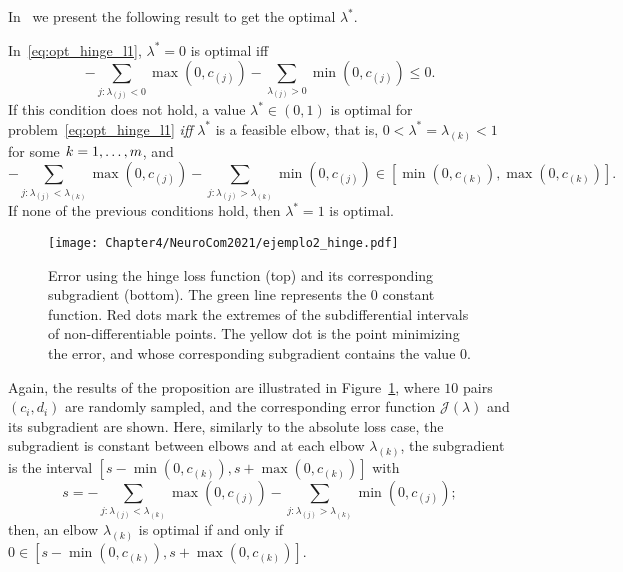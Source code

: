 In~\citet[Proposition 2]{RuizAD21} we present the following result to get the optimal $\lambda^*$.
\begin{prop}\label{prop:hinge_neurocom2020}
    In~\eqref{eq:opt_hinge_l1}, $\lambda^*=0$ is optimal iff
    \begin{equation}\label{eq:sol_hinge_0}
        -\sum_{j: \lambda_{(j)}<0} \max(0, c_{(j)}) - \sum_{\lambda_{(j)}>0} \min(0, c_{(j)}) \leq 0 .
        \end{equation}
        If this condition does not hold, a value $\lambda^* \in (0, 1)$ is optimal for problem~\eqref{eq:opt_hinge_l1} \emph{iff} $\lambda^*$ is a feasible elbow, that is, $0 < \lambda^* = \lambda_{(k)} < 1$ for some $k=1, \dotsc, m$, and
    \begin{equation}\label{eq:sol_hinge}
        -\sum_{j: \lambda_{(j)}< \lambda_{(k)}} \max(0, c_{(j)}) - \sum_{j: \lambda_{(j)}>  \lambda_{(k)}} \min(0, c_{(j)}) \in \left[\min(0, c_{(k)}), \max(0, c_{(k)}) \right] .
    \end{equation}
    If none of the previous conditions hold, then $\lambda^*=1$ is optimal.
\end{prop}
\begin{figure}[t!]
    \centering
    \texttt{[image: Chapter4/NeuroCom2021/ejemplo2\_hinge.pdf]}
    \caption{Error using the hinge loss function (top) and its corresponding subgradient (bottom). The green line represents the $0$ constant function. Red dots mark the extremes of the subdifferential intervals of non-differentiable points. The yellow dot is the point minimizing the error, and whose corresponding subgradient contains the value $0$.}
    \label{fig:hinge_error}
\end{figure}

Again, the results of the proposition are illustrated in Figure~\ref{fig:hinge_error}, where $10$ pairs $(c_i, d_i)$ are randomly sampled, and the corresponding error function $\mathcal{J}(\lambda)$ and its subgradient are shown. Here, similarly to the absolute loss case, the subgradient is constant between elbows and at each elbow $\lambda_{(k)}$, the subgradient is the interval $[s - \min(0, c_{(k)}), s + \max(0, c_{(k)})]$ with 
$$ s = -\sum_{j: \lambda_{(j)}< \lambda_{(k)}} \max(0, c_{(j)}) - \sum_{j: \lambda_{(j)}>  \lambda_{(k)}} \min(0, c_{(j)}) ;$$
then, an elbow $\lambda_{(k)}$ is optimal if and only if $0 \in [s - \min(0, c_{(k)}), s + \max(0, c_{(k)})]$.

